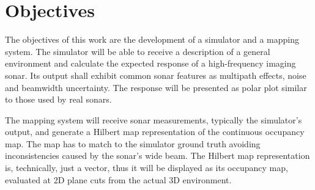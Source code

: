 

\section{Objectives}



The objectives of this work are the development of a simulator and a mapping
system. The simulator will be able to receive a description of a general
environment and calculate the expected response of a high-frequency imaging sonar. Its output
shall exhibit common sonar features as multipath effects, noise and beamwidth
uncertainty. The response will be presented as polar plot similar to those used
by real sonars.

The mapping system will receive sonar measurements, typically the simulator's
output, and generate a Hilbert map representation of the continuous occupancy
map.
The map has to match to the simulator ground truth avoiding inconsistencies
caused by the sonar's wide beam. The Hilbert map representation is, technically,
just a vector, thus it will be displayed as its occupancy map, evaluated at 2D
plane cuts from the actual 3D environment.




% 
% 

